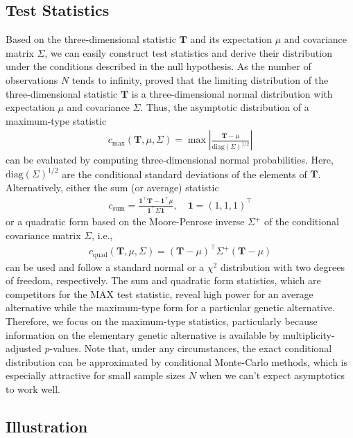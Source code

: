 \documentclass[bimj,fleqn]{w-art}
\newcommand{\T}{\mathbf{T}}
\begin{document}
\subsection{Test Statistics}

Based on the three-dimensional statistic $\T$ and its expectation 
$\mu$ and covariance matrix $\Sigma$, we can easily construct test 
statistics and derive their distribution under the conditions
described in the null hypothesis. As the number of observations 
$N$ tends to infinity, \citet{StrasserWeber1999}
proved that the limiting distribution of the three-dimensional 
statistic $\T$ is a three-dimensional normal distribution with 
expectation $\mu$ and covariance $\Sigma$. Thus, the asymptotic distribution
of a maximum-type statistic
\begin{eqnarray*}
c_\text{max}(\T, \mu, \Sigma)  = \max \left| \frac{\T - \mu}{\text{diag}(\Sigma)^{1/2}} \right|
\end{eqnarray*}
can be evaluated by computing three-dimensional normal probabilities. Here,
$\text{diag}(\Sigma)^{1/2}$ are the conditional standard deviations of
the elements of $\T$. Alternatively, either the sum (or average) statistic
\begin{eqnarray*}
c_\text{sum} = \frac{\mathbf{1}^\top \T - \mathbf{1}^\top\mu}{\mathbf{1}^\top \Sigma \mathbf{1}}, \quad \mathbf{1} = (1, 1, 1)^\top
\end{eqnarray*}
or a quadratic form 
based on the Moore-Penrose inverse $\Sigma^+$ of the conditional covariance
matrix $\Sigma$, i.e.,
\begin{eqnarray*}
c_\text{quad}(\T, \mu, \Sigma)  = (\T - \mu)^\top \Sigma^+ (\T - \mu)
\end{eqnarray*}
can be used and 
follow a standard normal or a $\chi^2$ distribution with two degrees of freedom, respectively. 
The sum and quadratic form statistics, which are competitors for the MAX 
test statistic,
reveal high power for an average alternative while the maximum-type 
form for a particular genetic alternative. Therefore, we focus on the 
maximum-type statistics, particularly because information on the elementary 
genetic alternative is available by multiplicity-adjusted $p$-values. 
Note that, under any circumstances, the exact conditional distribution 
can be approximated by conditional Monte-Carlo methods, which is especially 
attractive for small sample sizes $N$ when we can't expect asymptotics 
to work well.

\subsection{Illustration}
\end{document}
